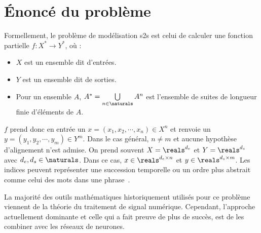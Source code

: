 \section{Énoncé du problème}
\label{sec.statement}

Formellement, le problème de modélisation \gls{s2s} est celui de calculer une fonction partielle
\(f: X^\ast \to Y^\ast\), où :
\begin{itemize}
    \item  \(X\) est un ensemble dit d'entrées. 
    \item \(Y\) est un ensemble dit de sorties.
    \item Pour un ensemble \(A\), \(A^\ast = \bigcup\limits_{n\in\naturals}A^n\)
    est l'ensemble de suites de longueur finie d'éléments de \(A\).
\end{itemize}
\(f\) prend donc en entrée un \(x = (x_1, x_2,\cdots, x_n)\in X^n\) 
et renvoie un \(y = (y_1, y_2,\cdots, y_m)\in Y^m\).
Dans le cas général, \(n\neq m\) et aucune hypothèse d'alignement n'est admise.
On prend souvent \(X = \reals^{d_e}\) et \(Y = \reals^{d_s}\) avec \(d_e, d_s\in\naturals\).
Dans ce cas, 
\(x\in \reals^{d_e \times n}\) et \(y\in \reals^{d_s \times m}\).
Les indices peuvent représenter une succession temporelle 
ou un ordre plus abstrait comme celui des mots dans une phrase~\cite{Martins_2018}.

La majorité des outils mathématiques historiquement utilisés pour ce problème 
viennent de la théorie du traitement de signal numérique.
Cependant, l'approche actuellement dominante et celle qui a fait preuve de plus de succès,  
est de les combiner avec les réseaux de neurones.
